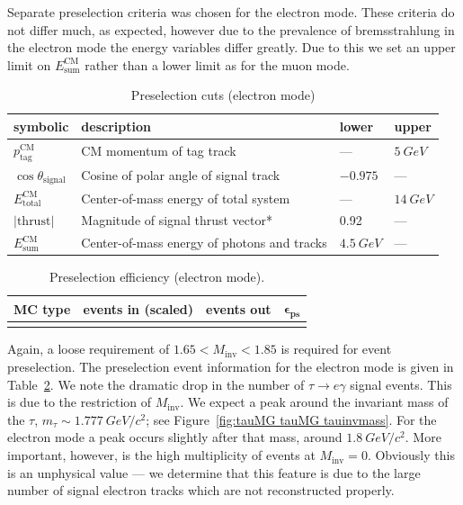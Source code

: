\documentclass[12pt]{thesis}  %
\begin{document}
Separate preselection criteria was chosen for the electron mode. These criteria do not differ much, as expected, however due to the prevalence of bremsstrahlung in the electron mode the energy variables differ greatly. Due to this we set an upper limit on $E^{\text{CM}}_{\text{sum}}$ rather than a lower limit as for the muon mode.

\begin{table}[h]
\centering
\begin{tabular}{llll}
\textbf{symbolic} & \textbf{description} & \textbf{lower} & \textbf{upper} \\ \hline
$p_{\text{tag}}^{\text{CM}}$  & CM momentum of tag track & --- & $\SI{5}{GeV}$ \\
$\cos\theta_{\text{signal}}$ & Cosine of polar angle of signal track & $-0.975$ & --- \\
$E_{\text{total}}^{\text{CM}}$ & Center-of-mass energy of total system  & --- & $\SI{14}{GeV}$ \\
$\lvert\text{thrust}\rvert$ & Magnitude of signal thrust vector* & 0.92 & --- \\
$E_{\text{sum}}^{\text{CM}}$ & Center-of-mass energy of photons and tracks & $\SI{4.5}{GeV}$ & ---
\end{tabular}
\caption{Preselection cuts (electron mode)}
\label{tab:preselection cuts electron mode}
\end{table}

\begin{table}[h]
\centering
\begin{tabular}{lrrc}
\textbf{MC type}         & \textbf{events in (scaled)} & \textbf{events out} & $\mathbf{\epsilon_{\text{ps}}}$ \\ \hline 
\rowcolor[HTML]{EFEFEF} 
\end{tabular}
\caption{Preselection efficiency (electron mode).}
\label{tab:preselection events electron mode}
\end{table}

Again, a loose requirement of $1.65 < M_{\text{inv}} < 1.85$ is required for event preselection. The preselection event information for the electron mode is given in Table~\ref{tab:preselection events electron mode}. We note the dramatic drop in the number of $\tau\to e\gamma$ signal events. This is due to the restriction of $M_{\text{inv}}$. We expect a peak around the invariant mass of the $\tau$, $m_{\tau}\sim \SI{1.777}{GeV/c^2}$; see Figure~\ref{fig:tauMG tauMG tauinvmass}. For the electron mode a peak occurs slightly after that mass, around $\SI{1.8}{GeV/c^2}$. More important, however, is the high multiplicity of events at $M_{\text{inv}}=0$. Obviously this is an unphysical value --- we determine that this feature is due to the large number of signal electron tracks which are not reconstructed properly.
\end{document}
